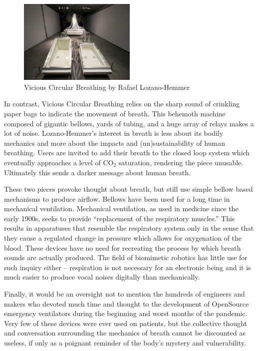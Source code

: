 \documentclass[letterpaper]{article}
\begin{document}
\begin{figure}[h]
\includegraphics[width=0.5\textwidth]{images/vcb_madrid_2014.jpg}
\caption{Vicious Circular Breathing by Rafael Lozano-Hemmer}
\label{fig:hemmer}
\end{figure}


In contrast, Vicious Circular Breathing relies on the sharp sound of crinkling paper bags to indicate the movement of breath. This behemoth machine composed of gigantic bellows, yards of tubing, and a huge array of relays makes a lot of noise. Lozano-Hemmer's interest in breath is less about its bodily mechanics and more about the impacts and (un)sustainability of human breathing. Users are invited to add their breath to the closed loop system which eventually approaches a level of CO$_2$ saturation, rendering the piece unusable. Ultimately this sends a darker message about human breath.

These two pieces provoke thought about breath, but still use simple bellow based mechanisms to produce airflow. Bellows have been used for a long time in mechanical ventilation. Mechanical ventilation, as used in medicine since the early 1900s, seeks to provide ``replacement of the respiratory muscles.''\cite{ventilatorhistory} This results in apparatuses that resemble the respiratory system only in the sense that they cause a regulated change in pressure which allows for oxygenation of the blood. These devices have no need for recreating the process by which breath sounds are actually produced. The field of biomimetic robotics has little use for such inquiry either -- respiration is not necessary for an electronic being and it is much easier to produce vocal noises digitally than mechanically. 

Finally, it would be an oversight not to mention the hundreds of engineers and makers who devoted much time and thought to the development of OpenSource emergency ventilators during the beginning and worst months of the pandemic.\cite{read} Very few of these devices were ever used on patients, but the collective thought and conversation surrounding the mechanics of breath cannot be discounted as useless, if only as a poignant reminder of the body's mystery and vulnerability. 
\end{document}
